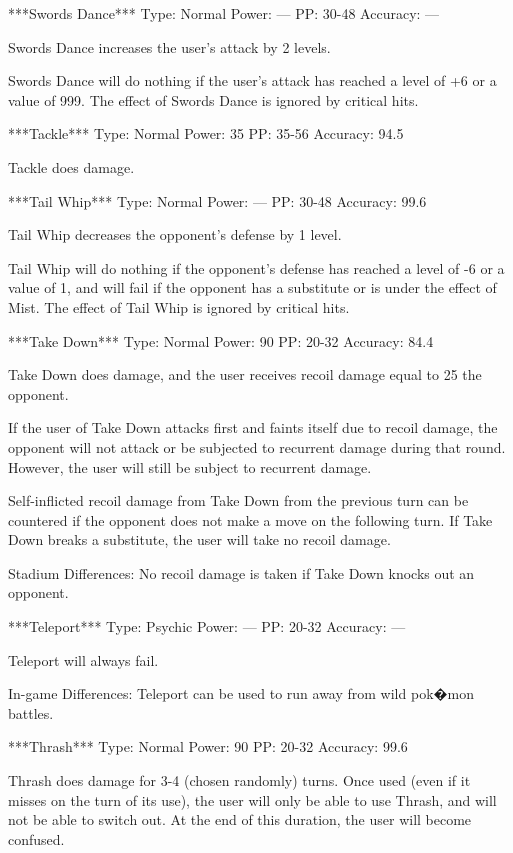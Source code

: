 \documentclass[reprint, aps, prl, paper=A4]{revtex4-1}
\begin{document}
***Swords Dance***
Type: Normal
Power: ---
PP: 30-48
Accuracy: ---

Swords Dance increases the user's attack by 2 levels.

Swords Dance will do nothing if the user's attack has reached a level of +6 or a value of 999.
The effect of Swords Dance is ignored by critical hits.


***Tackle***
Type: Normal
Power: 35
PP: 35-56
Accuracy: 94.5%

Tackle does damage.


***Tail Whip***
Type: Normal
Power: ---
PP: 30-48
Accuracy: 99.6%

Tail Whip decreases the opponent's defense by 1 level.

Tail Whip will do nothing if the opponent's defense has reached a level of -6 or a value of 1,
and will fail if the opponent has a substitute or is under the effect of Mist. The effect of
Tail Whip is ignored by critical hits.


***Take Down***
Type: Normal
Power: 90
PP: 20-32
Accuracy: 84.4%

Take Down does damage, and the user receives recoil damage equal to 25%
the opponent.

If the user of Take Down attacks first and faints itself due to recoil damage, the opponent
will not attack or be subjected to recurrent damage during that round. However, the user will
still be subject to recurrent damage.

Self-inflicted recoil damage from Take Down from the previous turn can be countered if the
opponent does not make a move on the following turn. If Take Down breaks a substitute, the user
will take no recoil damage.

Stadium Differences:
No recoil damage is taken if Take Down knocks out an opponent.


***Teleport***
Type: Psychic
Power: ---
PP: 20-32
Accuracy: ---

Teleport will always fail.

In-game Differences:
Teleport can be used to run away from wild pok�mon battles.


***Thrash***
Type: Normal
Power: 90
PP: 20-32
Accuracy: 99.6%

Thrash does damage for 3-4 (chosen randomly) turns. Once used (even if it misses on the turn of
its use), the user will only be able to use Thrash, and will not be able to switch out. At the
end of this duration, the user will become confused.
\end{document}
